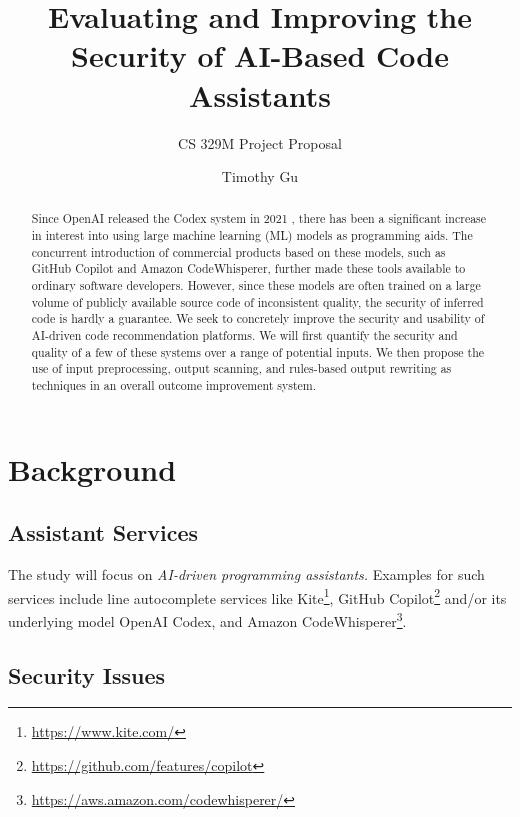 \documentclass[10pt,sigplan,screen,nonacm]{acmart}
\begin{document}
\title{Evaluating and Improving the Security of AI-Based Code Assistants}
\subtitle{CS 329M Project Proposal}

\author{Timothy Gu}

\renewcommand{\shorttitle}{CS 329M Project Proposal}
\renewcommand{\shortauthors}{Gu}

\begin{abstract}
    Since Open\-AI released the Codex system in 2021 \cite{Chen2021EvaluatingLL}, there has been a significant increase in interest into using large machine learning (ML) models as programming aids. The concurrent introduction of commercial products based on these models, such as GitHub Copilot and Amazon Code\-Whis\-per\-er, further made these tools available to ordinary software developers. However, since these models are often trained on a large volume of publicly available source code of inconsistent quality, the security of inferred code is hardly a guarantee. We seek to concretely improve the security and usability of AI-driven code recommendation platforms. We will first quantify the security and quality of a few of these systems over a range of potential inputs. We then propose the use of input preprocessing, output scanning, and rules-based output rewriting as techniques in an overall outcome improvement system.
\end{abstract}

\maketitle

\section{Background}

\subsection{Assistant Services}
The study will focus on \emph{AI-driven programming assistants.} Examples for such services include line autocomplete services like Kite\footnote{\url{https://www.kite.com/}}, GitHub Copilot\footnote{\url{https://github.com/features/copilot}} and/or its underlying model Open\-AI Codex, and Amazon Code\-Whis\-per\-er\footnote{\url{https://aws.amazon.com/codewhisperer/}}.

\subsection{Security Issues}
\end{document}
